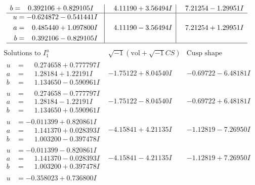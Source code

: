 \documentclass[1p]{elsarticle_modified}
\theoremstyle{definition}
\newcommand{\I}{\sqrt{-1}}
\begin{document}
$$\begin{array}{c|c|c}
\begin{aligned}
b &= \phantom{-}0.392106 + 0.829105 I\end{aligned}
 & \phantom{-}4.11190 + 3.56494 I & \phantom{-}7.21254 - 1.29951 I \\ \hline\begin{aligned}
u &= -0.624872 - 0.541441 I \\
a &= \phantom{-}0.485440 + 1.097800 I \\
b &= \phantom{-}0.392106 - 0.829105 I\end{aligned}
 & \phantom{-}4.11190 - 3.56494 I & \phantom{-}7.21254 + 1.29951 I\\
 \hline 
 \end{array}$$\newpage$$\begin{array}{c|c|c}  
\text{Solutions to }I^u_{1}& \I (\text{vol} + \sqrt{-1}CS) & \text{Cusp shape}\\
 \hline 
\begin{aligned}
u &= \phantom{-}0.274658 + 0.777797 I \\
a &= \phantom{-}1.28184 + 1.22191 I \\
b &= \phantom{-}1.134650 - 0.590961 I\end{aligned}
 & -1.75122 + 8.04540 I & -0.69722 - 6.48181 I \\ \hline\begin{aligned}
u &= \phantom{-}0.274658 - 0.777797 I \\
a &= \phantom{-}1.28184 - 1.22191 I \\
b &= \phantom{-}1.134650 + 0.590961 I\end{aligned}
 & -1.75122 - 8.04540 I & -0.69722 + 6.48181 I \\ \hline\begin{aligned}
u &= -0.011399 + 0.820861 I \\
a &= \phantom{-}1.141370 + 0.028393 I \\
b &= \phantom{-}1.003200 - 0.397478 I\end{aligned}
 & -4.15841 + 4.21135 I & -1.12819 - 7.26950 I \\ \hline\begin{aligned}
u &= -0.011399 - 0.820861 I \\
a &= \phantom{-}1.141370 - 0.028393 I \\
b &= \phantom{-}1.003200 + 0.397478 I\end{aligned}
 & -4.15841 - 4.21135 I & -1.12819 + 7.26950 I \\ \hline\begin{aligned}
u &= -0.358023 + 0.736800 I \\

\end{aligned}
\end{array}$$
\end{document}

